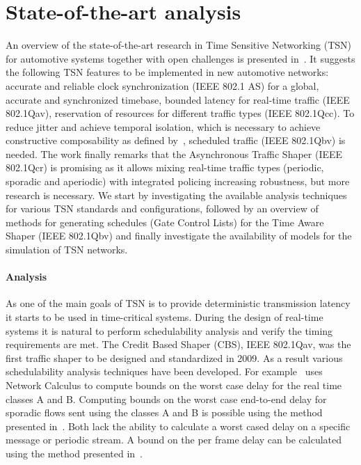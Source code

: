 \section{State-of-the-art analysis}
\label{sec:sota}
An overview of the state-of-the-art research in Time Sensitive Networking (TSN) for automotive systems together with open challenges is presented in~\cite{ashjaei2021time}. It suggests the following TSN features to be implemented in new automotive networks: accurate and reliable clock synchronization (IEEE 802.1 AS) for a global, accurate and synchronized timebase, bounded latency for real-time traffic (IEEE 802.1Qav), reservation of resources for different traffic types (IEEE 802.1Qcc). To reduce jitter and achieve temporal isolation, which is necessary to achieve constructive composability as defined by~\cite{kopetz2003time}, scheduled traffic (IEEE 802.1Qbv) is needed. The work finally remarks that the Asynchronous Traffic Shaper (IEEE 802.1Qcr) is promising as it allows mixing real-time traffic types (periodic, sporadic and aperiodic) with integrated policing increasing robustness, but more research is necessary. We start by investigating the available analysis techniques for various TSN standards and configurations, followed by an overview of methods for generating schedules (Gate Control Lists) for the Time Aware Shaper (IEEE 802.1Qbv) and finally investigate the availability of models for the simulation of TSN networks.

\paragraph{Analysis}
As one of the main goals of TSN is to provide deterministic transmission latency it starts to be used in time-critical systems. During the design of real-time systems it is natural to perform schedulability analysis and verify the timing requirements are met. The Credit Based Shaper (CBS), IEEE 802.1Qav, was the first traffic shaper to be designed and standardized in 2009. As a result various schedulability analysis techniques have been developed. For example~\cite{de2014complete} uses Network Calculus to compute bounds on the worst case delay for the real time classes A and B. Computing bounds on the worst case end-to-end delay for sporadic flows sent using the classes A and B is possible using the method presented in~\cite{li2017deterministic}. Both lack the ability to calculate a worst cased delay on a specific message or periodic stream. A bound on the per frame delay can be calculated using the method presented in~\cite{cao2016independent}. 

